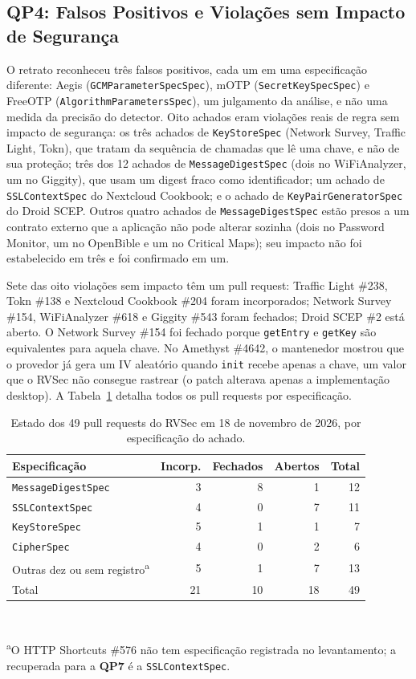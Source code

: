 \documentclass[conference]{IEEEtran}
\newcommand{\researchq}[1]{\textbf{QP#1}}
\begin{document}
\subsection{\researchq{4}: Falsos Positivos e Violações sem Impacto de Segurança}

O retrato reconheceu três falsos positivos, cada um em uma
especificação diferente: Aegis (\texttt{GCMParameterSpecSpec}), mOTP
(\texttt{SecretKeySpecSpec}) e FreeOTP (\texttt{AlgorithmParametersSpec}),
um julgamento da análise, e não uma medida da precisão do detector. Oito
achados eram violações reais de regra sem impacto de segurança: os três
achados de \texttt{KeyStoreSpec} (Network Survey, Traffic Light, Tokn), que tratam
da sequência de chamadas que lê uma chave, e não de sua proteção; três dos 12
achados de \texttt{MessageDigestSpec} (dois no WiFiAnalyzer, um no Giggity),
que usam um digest fraco como identificador; um achado de \texttt{SSLContextSpec}
do Nextcloud Cookbook; e o achado de
\texttt{KeyPairGeneratorSpec} do Droid SCEP. Outros quatro achados de \texttt{MessageDigestSpec}
estão presos a um contrato externo que a aplicação não pode alterar sozinha
(dois no Password Monitor, um no OpenBible e um no Critical Maps); seu
impacto não foi estabelecido em três e foi confirmado em um.

Sete das oito violações sem impacto têm um pull request: Traffic
Light \#238, Tokn \#138 e Nextcloud Cookbook \#204 foram incorporados;
Network Survey \#154, WiFiAnalyzer \#618 e Giggity \#543 foram fechados; Droid
SCEP \#2 está aberto. O Network Survey \#154 foi fechado porque \texttt{getEntry}
e \texttt{getKey} são equivalentes para aquela chave. No Amethyst \#4642, o
mantenedor mostrou que o provedor já gera um IV aleatório quando
\texttt{init} recebe apenas a chave, um valor que o RVSec não consegue rastrear (o patch
alterava apenas a implementação desktop). A Tabela~\ref{tab:pr-spec} detalha todos
os pull requests por especificação.

\begin{table}[H]
\centering
\caption{Estado dos 49 pull requests do RVSec em 18 de novembro de 2026, por
especificação do achado.}
\label{tab:pr-spec}
\footnotesize
\setlength{\tabcolsep}{4pt}
\begin{tabular}{lrrrr}
\toprule
Especificação & Incorp. & Fechados & Abertos & Total \\
\midrule
\texttt{MessageDigestSpec} & 3 & 8 & 1 & 12 \\
\texttt{SSLContextSpec}    & 4 & 0 & 7 & 11 \\
\texttt{KeyStoreSpec}      & 5 & 1 & 1 & 7 \\
\texttt{CipherSpec}        & 4 & 0 & 2 & 6 \\
Outras dez ou sem registro\textsuperscript{a} & 5 & 1 & 7 & 13 \\
\midrule
Total & 21 & 10 & 18 & 49 \\
\bottomrule
\end{tabular}
\\[2pt]\raggedright\scriptsize\textsuperscript{a}O HTTP Shortcuts \#576 não tem
especificação registrada no levantamento; a recuperada para a \researchq{7} é a \texttt{SSLContextSpec}.
\end{table}
\end{document}
